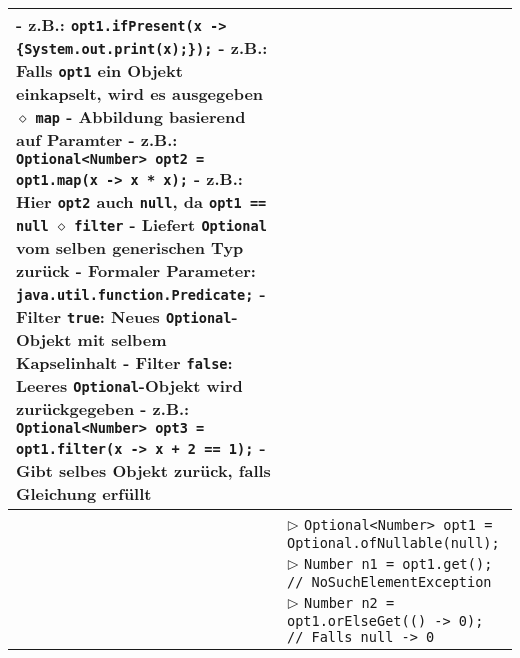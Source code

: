 \begin{tabular}{ | p{} p{} | }
{	\hspace{0.6cm} - z.B.: \texttt{opt1.ifPresent(x -> \{System.out.print(x);\});} \\
	\hspace{0.6cm} - z.B.: Falls \texttt{opt1} ein Objekt einkapselt, wird es ausgegeben \\
	\hspace{0.4cm} $\diamond$ \texttt{map} \\
	\hspace{0.6cm} - Abbildung basierend auf Paramter \\
	\hspace{0.6cm} - z.B.: \texttt{Optional<Number> opt2 = opt1.map(x -> x * x);} \\
	\hspace{0.6cm} - z.B.: Hier \texttt{opt2} auch \texttt{null}, da \texttt{opt1 == null} \\
	\hspace{0.4cm} $\diamond$ \texttt{filter} \\
	\hspace{0.6cm} - Liefert \texttt{Optional} vom selben generischen Typ zurück \\
	\hspace{0.6cm} - Formaler Parameter: \texttt{java.util.function.Predicate;} \\
	\hspace{0.6cm} - Filter \texttt{true}: Neues \texttt{Optional}-Objekt mit selbem Kapselinhalt \\ 
	\hspace{0.6cm} - Filter \texttt{false}: Leeres \texttt{Optional}-Objekt wird zurückgegeben \\
	\hspace{0.6cm} - z.B.: \texttt{Optional<Number> opt3 = opt1.filter(x -> x + 2 == 1);} \\
	\hspace{0.6cm} - Gibt selbes Objekt zurück, falls Gleichung erfüllt } \\ \hline

	\makecell[l]{Beispiel} & \makecell[l]{
	$\triangleright$ \texttt{Optional<Number> opt1 = Optional.ofNullable(null);} \\
	$\triangleright$ \texttt{Number n1 = opt1.get(); // NoSuchElementException} \\
	$\triangleright$ \texttt{Number n2 = opt1.orElseGet(() -> 0); // Falls null -> 0}  } \\ \hline
	
	\end{tabular}

